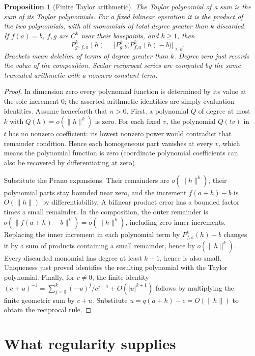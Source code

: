 \documentclass[11pt,oneside,openany]{book}
\newtheorem{proposition}[theorem]{Proposition}
\theoremstyle{definition}
\theoremstyle{remark}
\newcommand{\abs}[1]{\lvert#1\rvert}
\newcommand{\norm}[1]{\lVert#1\rVert}
\newcommand{\family}[1]{}
\begin{document}
\begin{proposition}[Finite Taylor arithmetic]\label{d04:03:taylor-arithmetic}
The Taylor polynomial of a sum is the sum of its Taylor polynomials.
For a fixed bilinear operation it is the product of the two polynomials,
with all monomials of total degree greater than $k$ discarded.
If $f(a)=b$, $f,g$ are $C^k$ near their basepoints, and $k\geq1$, then
\[
 P_{g\circ f,a}^k(h)=
 \big[P_{g,b}^k\big(P_{f,a}^k(h)-b\big)\big]_{\leq k}.
\]
Brackets mean deletion of terms of degree greater than $k$. Degree zero
just records the value of the composition. Scalar reciprocal series are
computed by the same truncated arithmetic with a nonzero constant term.
\end{proposition}
\begin{proof}
In dimension zero every polynomial function is determined by its value at
the sole increment $0$; the asserted arithmetic identities are simply
evaluation identities. Assume henceforth that $n>0$.
First, a polynomial $Q$ of degree at most $k$ with
$Q(h)=o(\norm{h}^k)$ is zero. For each fixed $v$, the polynomial $Q(tv)$
in $t$ has no nonzero coefficient: its lowest nonzero power would contradict
that remainder condition. Hence each homogeneous part vanishes at every
$v$, which means the polynomial function is zero (coordinate polynomial
coefficients can also be recovered by differentiating at zero).

Substitute the Peano expansions. Their remainders are $o(\norm{h}^k)$,
their polynomial parts stay bounded near zero, and the increment
$f(a+h)-b$ is $O(\norm{h})$ by differentiability. A bilinear product error
has a bounded factor times a small remainder. In the composition, the outer
remainder is $o(\norm{f(a+h)-b}^k)=o(\norm{h}^k)$, including zero
inner increments. Replacing the inner increment in each polynomial term by
$P_{f,a}^k(h)-b$ changes it by a sum of products containing a small
remainder, hence by $o(\norm{h}^k)$. Every discarded monomial has degree
at least $k+1$, hence is also small. Uniqueness just proved identifies the
resulting polynomial with the Taylor polynomial. Finally, for $c\ne0$,
the finite identity
$(c+u)^{-1}=\sum_{j=0}^k(-u)^j/c^{j+1}+O(\abs{u}^{k+1})$
follows by multiplying the finite geometric sum by $c+u$. Substitute
$u=q(a+h)-c=O(\norm{h})$ to obtain the reciprocal rule.
\end{proof}

\section{What regularity supplies}
\family{K04.03.09}
\end{document}
